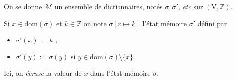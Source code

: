 \documentclass[../main]{subfiles}
\begin{document}
  \begin{defn}
    On se donne $\mathcal{M}$ un ensemble de dictionnaires, notés $\sigma, \sigma'$, \textit{etc} sur $(\mathrm{V}, \mathds{Z})$.

    Si $x \in \mathrm{dom}(\sigma)$ et $k \in \mathds{Z}$ on note $\sigma [x \mapsto k]$ l'état mémoire $\sigma'$ défini par 
     \begin{itemize}
      \item $\sigma'(x) := k$ ;
      \item  $\sigma'(y) := \sigma(y)$ si  $y \in \mathrm{dom}(\sigma) \setminus \{x\}$.
    \end{itemize}

    Ici, on \textit{écrase} la valeur de $x$ dans l'état mémoire $\sigma$.
  \end{defn}
\end{document}
